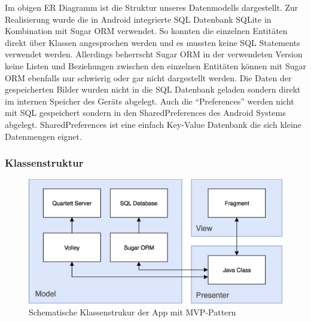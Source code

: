 \documentclass{scrartcl}
\begin{document}
\noindent
Im obigen ER Diagramm ist die Struktur unseres Datenmodells dargestellt. Zur
Realisierung wurde die in Android integrierte SQL Datenbank SQLite in
Kombination mit Sugar ORM verwendet. So konnten die einzelnen Entitäten direkt
über Klassen angesprochen werden und es mussten keine SQL Statements verwendet
werden. Allerdings beherrscht Sugar ORM in der verwendeten Version keine Listen
und Beziehungen zwischen den einzelnen Entitäten können mit Sugar ORM ebenfalls
nur schwierig oder gar nicht dargestellt werden. Die Daten der gespeicherten
Bilder wurden nicht in die SQL Datenbank geladen sondern direkt im internen
Speicher des Geräts abgelegt. Auch die \enquote{Preferences} werden nicht mit
SQL gespeichert sondern in den SharedPreferences des Android Systems abgelegt.
SharedPreferences ist eine einfach Key-Value Datenbank die sich kleine
Datenmengen eignet.

\subsubsection{Klassenstruktur}

\begin{figure}[!ht]
  \centering
  \includegraphics[width=\textwidth]{img/class_structure.png}
  \caption{Schematische Klassenstrukur der App mit MVP-Pattern}
\end{figure}
\end{document}
